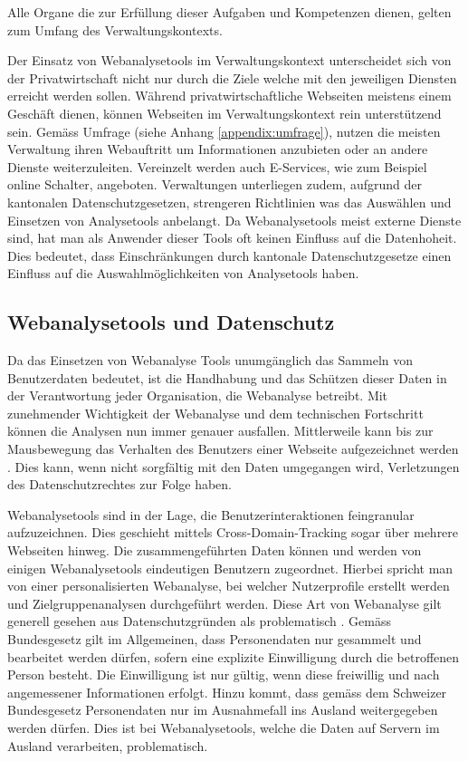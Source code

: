 Alle Organe die zur Erfüllung dieser Aufgaben und Kompetenzen dienen, gelten zum Umfang des Verwaltungskontexts.

Der Einsatz von Webanalysetools im Verwaltungskontext unterscheidet sich von der Privatwirtschaft nicht nur durch die Ziele welche mit den jeweiligen Diensten erreicht werden sollen. Während privatwirtschaftliche Webseiten meistens einem Geschäft dienen, können Webseiten im Verwaltungskontext rein unterstützend sein. Gemäss Umfrage (siehe Anhang \ref{appendix:umfrage}), nutzen die meisten Verwaltung ihren Webauftritt um Informationen anzubieten oder an andere Dienste weiterzuleiten. Vereinzelt werden auch E-Services, wie zum Beispiel online Schalter, angeboten. Verwaltungen unterliegen zudem, aufgrund der kantonalen Datenschutzgesetzen, strengeren Richtlinien was das Auswählen und Einsetzen von Analysetools anbelangt. Da Webanalysetools meist externe Dienste sind, hat man als Anwender dieser Tools oft keinen Einfluss auf die Datenhoheit. Dies bedeutet, dass Einschränkungen durch kantonale Datenschutzgesetze einen Einfluss auf die Auswahlmöglichkeiten von Analysetools haben.

\subsection{Webanalysetools und Datenschutz} \label{subsec:datenschutz}

Da das Einsetzen von Webanalyse Tools unumgänglich das Sammeln von Benutzerdaten bedeutet, ist die Handhabung und das Schützen dieser Daten in der Verantwortung jeder Organisation, die Webanalyse betreibt. Mit zunehmender Wichtigkeit der Webanalyse und dem technischen Fortschritt können die Analysen nun immer genauer ausfallen. Mittlerweile kann bis zur Mausbewegung das Verhalten des Benutzers einer Webseite aufgezeichnet werden \parencite[S. 1]{EcommerceUndDatenschutz}. Dies kann, wenn nicht sorgfältig mit den Daten umgegangen wird, Verletzungen des Datenschutzrechtes zur Folge haben.

Webanalysetools sind in der Lage, die Benutzerinteraktionen feingranular aufzuzeichnen. Dies geschieht mittels Cross-Domain-Tracking sogar über mehrere Webseiten hinweg. Die zusammengeführten Daten können und werden von einigen Webanalysetools eindeutigen Benutzern zugeordnet. Hierbei spricht man von einer personalisierten Webanalyse, bei welcher Nutzerprofile erstellt werden und Zielgruppenanalysen durchgeführt werden. Diese Art von Webanalyse gilt generell gesehen aus Datenschutzgründen als problematisch \parencite[S. 2]{EcommerceUndDatenschutz}. Gemäss Bundesgesetz \parencite[§§ 4 Abs. 5]{SDSG} gilt im Allgemeinen, dass Personendaten nur gesammelt und bearbeitet werden dürfen, sofern eine explizite Einwilligung durch die betroffenen Person besteht. Die Einwilligung ist nur gültig, wenn diese freiwillig und nach angemessener Informationen erfolgt. Hinzu kommt, dass gemäss dem Schweizer Bundesgesetz \parencite[§§ 6 Abs. 1]{SDSG} Personendaten nur im Ausnahmefall ins Ausland weitergegeben werden dürfen. Dies ist bei Webanalysetools, welche die Daten auf Servern im Ausland verarbeiten, problematisch.

